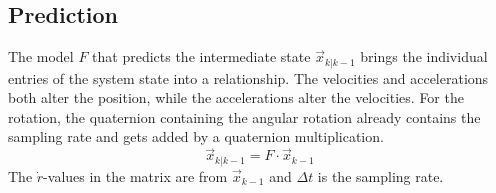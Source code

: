 \subsection{Prediction}
\label{sec:KalmanPrediction}
The model $F$ that predicts the intermediate state $\vec{x}_{k|k-1}$ brings the individual entries of the system state into a relationship. The velocities and accelerations both alter the position, while the accelerations alter the velocities. For the rotation, the quaternion containing the angular rotation already contains the sampling rate and gets added by a quaternion multiplication. 
\begin{equation*}
    \vec{x}_{k|k-1} = 
    F
    \cdot
    \vec{x}_{k-1}
\end{equation*}
The $\dot{r}$-values in the matrix are from $\vec{x}_{k-1}$ and $\Delta t$ is the sampling rate.
